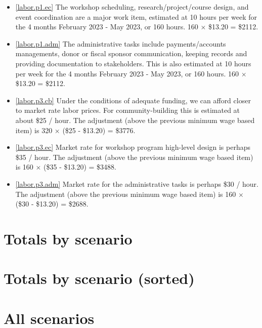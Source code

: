 \documentclass[10pt]{article}
\begin{document}
\begin{itemize}[leftmargin=*]
  \item[]{\ref{labor.p1.ec} The workshop scheduling, research/project/course design, and event coordination are a major work item, estimated at 10 hours per week for the 4 months February 2023 - May 2023, or 160 hours. 160 $\times$ \$13.20 = \$2112.}
  \item[]{\ref{labor.p1.adm} The administrative tasks include payments/accounts managements, donor or fiscal sponsor communication, keeping records and providing documentation to stakeholders. This is also estimated at 10 hours per week for the 4 months February 2023 - May 2023, or 160 hours. 160 $\times$ \$13.20 = \$2112.}
  \item[]{\ref{labor.p3.cb} Under the conditions of adequate funding, we can afford closer to market rate labor prices. For community-building this is estimated at about \$25 / hour. The adjustment (above the previous minimum wage based item) is 320 $\times$ (\$25 - \$13.20) = \$3776.}
  \item[]{\ref{labor.p3.ec} Market rate for workshop program high-level design is perhaps \$35 / hour. The adjustment (above the previous minimum wage based item) is 160 $\times$ (\$35 - \$13.20) = \$3488.}
  \item[]{\ref{labor.p3.adm} Market rate for the administrative tasks is perhaps \$30 / hour. The adjustment (above the previous minimum wage based item) is 160 $\times$ (\$30 - \$13.20) = \$2688.}
\end{itemize}

\section*{Totals by scenario}



\section*{Totals by scenario (sorted)}



\newpage

\section*{All scenarios}


\end{document}
